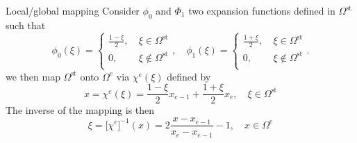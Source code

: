 \begin{frame}{Local/global mapping}
  Consider $\phi_0$ and $\Phi_1$ two expansion functions defined in $\Omega^{\text{st}}$ such that
  \begin{equation}
    \label{eq:42}
    \phi_0(\xi) =
    \begin{cases}
      \frac{1-\xi}{2}, \ & \xi \in \Omega^{\text{st}}\\
      0, & \xi \notin \Omega^{\text{st}}\\
    \end{cases},
    \quad
    \phi_1(\xi) =
    \begin{cases}
      \frac{1+\xi}{2}, \ & \xi \in \Omega^{\text{st}}\\
      0, & \xi \notin \Omega^{\text{st}}\\
    \end{cases}.
  \end{equation}
  we then map $\Omega^{\text{st}}$ onto $\Omega^e$ via $\chi^e(\xi)$ defined by
  \begin{equation}
    \label{eq:43}
    x = \chi^e(\xi) = \frac{1-\xi}{2} x_{e-1} + \frac{1+\xi}{2} x_e, \quad \xi \in \Omega^{\text{st}}
  \end{equation}
  The inverse of the mapping is then
  \begin{equation}
    \label{eq:44}
    \xi = \Big[\chi^e\Big]^{-1}(x) = 2 \frac{x - x_{e-1}}{x_e-x_{e-1}} -1 , \quad x \in \Omega^{e}
  \end{equation}
\end{frame}
